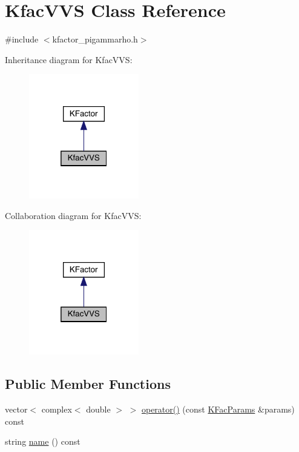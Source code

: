 \hypertarget{classKfacVVS}{}\section{Kfac\+V\+VS Class Reference}
\label{classKfacVVS}


{\ttfamily \#include $<$kfactor\+\_\+pigammarho.\+h$>$}



Inheritance diagram for Kfac\+V\+VS\+:
\nopagebreak
\begin{figure}[H]
\begin{center}
\leavevmode
\includegraphics[width=136pt]{da/d91/classKfacVVS__inherit__graph}
\end{center}
\end{figure}


Collaboration diagram for Kfac\+V\+VS\+:
\nopagebreak
\begin{figure}[H]
\begin{center}
\leavevmode
\includegraphics[width=136pt]{df/d9d/classKfacVVS__coll__graph}
\end{center}
\end{figure}
\subsection*{Public Member Functions}
\begin{DoxyCompactItemize}
\item 
vector$<$ complex$<$ double $>$ $>$ \mbox{\hyperlink{classKfacVVS_ae892df7c0a0595020b968fd9c87be256}{operator()}} (const \mbox{\hyperlink{classKFacParams}{K\+Fac\+Params}} \&params) const
\item 
string \mbox{\hyperlink{classKfacVVS_a2bd46e36671569204826348d5ec6d64a}{name}} () const
\end{DoxyCompactItemize}



